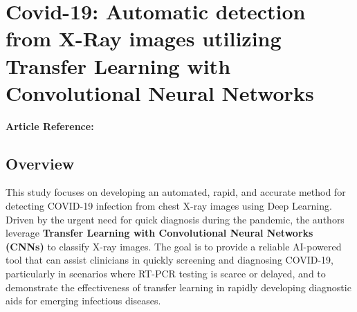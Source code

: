 




\section{Covid-19: Automatic detection from X-Ray images utilizing Transfer Learning with Convolutional Neural Networks}
\textbf{Article Reference:} \cite{apostolopoulosCovid19AutomaticDetection2020} 

\subsection*{Overview}
This study focuses on developing an automated, rapid, and accurate method for detecting COVID-19 infection from chest X-ray images using Deep Learning. Driven by the urgent need for quick diagnosis during the pandemic, the authors leverage \textbf{Transfer Learning with Convolutional Neural Networks (CNNs)} to classify X-ray images. The goal is to provide a reliable AI-powered tool that can assist clinicians in quickly screening and diagnosing COVID-19, particularly in scenarios where RT-PCR testing is scarce or delayed, and to demonstrate the effectiveness of transfer learning in rapidly developing diagnostic aids for emerging infectious diseases.

